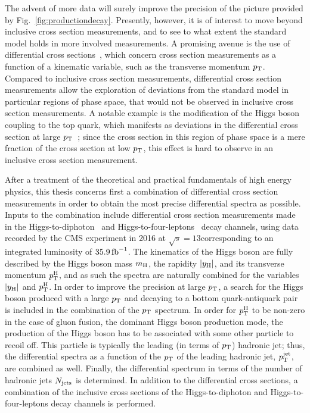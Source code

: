 The advent of more data will surely improve the precision of the picture provided by Fig.~\ref{fig:productiondecay}.
% 
Presently, however, it is of interest to move beyond inclusive cross section measurements, and to see to what extent the standard model holds in more involved measurements.
% 
A promising avenue is the use of differential cross sections~\cite{Aad:2014lwa,Khachatryan:2015rxa,Aad:2014tca,Khachatryan:2015yvw,Aad:2016lvc,Khachatryan:2016vnn,Aaboud:2018xdt,Sirunyan:2018kta,Aaboud:2017oem,Sirunyan:2017exp,Aaboud:2018ezd}, which concern cross section measurements as a function of a kinematic variable, such as the transverse momentum $p_\mathrm{T}$.
% 
Compared to inclusive cross section measurements, differential cross section measurements allow the exploration of deviations from the standard model in particular regions of phase space, that would not be observed in inclusive cross section measurements.
% 
A notable example is the modification of the Higgs boson coupling to the top quark, which manifests as deviations in the differential cross section at large $p_\mathrm{T}$~\cite{Grazzini:2017szg,Grazzini:2016paz}; since the cross section in this region of phase space is a mere fraction of the cross section at low $p_\mathrm{T}$, this effect is hard to observe in an inclusive cross section measurement.


After a treatment of the theoretical and practical fundamentals of high energy physics, this thesis concerns first a combination of differential cross section measurements in order to obtain the most precise differential spectra as possible.
% 
Inputs to the combination include differential cross section measurements made in the Higgs-to-diphoton~\cite{Sirunyan:2018kta} and Higgs-to-four-leptons~\cite{Sirunyan:2017exp} decay channels, using data recorded by the CMS experiment in 2016 at $\sqrt{s}=13$\TeV corresponding to an integrated luminosity of $35.9\,\text{fb}^{-1}$.
% 
The kinematics of the Higgs boson are fully described by the Higgs boson mass $m_{\mathrm{H}}$, the rapidity $\left|y_\mathrm{H}\right| $, and its transverse momentum $p_\mathrm{T}^\mathrm{H}$, and as such the spectra are naturally combined for the variables $\left|y_\mathrm{H}\right| $ and $p_\mathrm{T}^\mathrm{H}$.
% 
In order to improve the precision at large $p_\mathrm{T}$, a search for the Higgs boson produced with a large $p_\mathrm{T}$ and decaying to a bottom quark-antiquark pair~\cite{Sirunyan:2017dgc} is included in the combination of the $p_\mathrm{T}$ spectrum.
% 
% 
In order for $p_\mathrm{T}^\mathrm{H}$ to be non-zero in the case of gluon fusion, the dominant Higgs boson production mode, the production of the Higgs boson has to be associated with some other particle to recoil off.
% 
This particle is typically the leading (in terms of $p_\mathrm{T}$) hadronic jet; thus, the differential spectra as a function of the $p_\mathrm{T}$ of the leading hadronic jet, $p_\mathrm{T}^\text{jet} $, are combined as well.
% 
Finally, the differential spectrum in terms of the number of hadronic jets $N_\text{jets} $ is determined.
% 
In addition to the differential cross sections, a combination of the inclusive cross sections of the  Higgs-to-diphoton and Higgs-to-four-leptons decay channels is performed.


